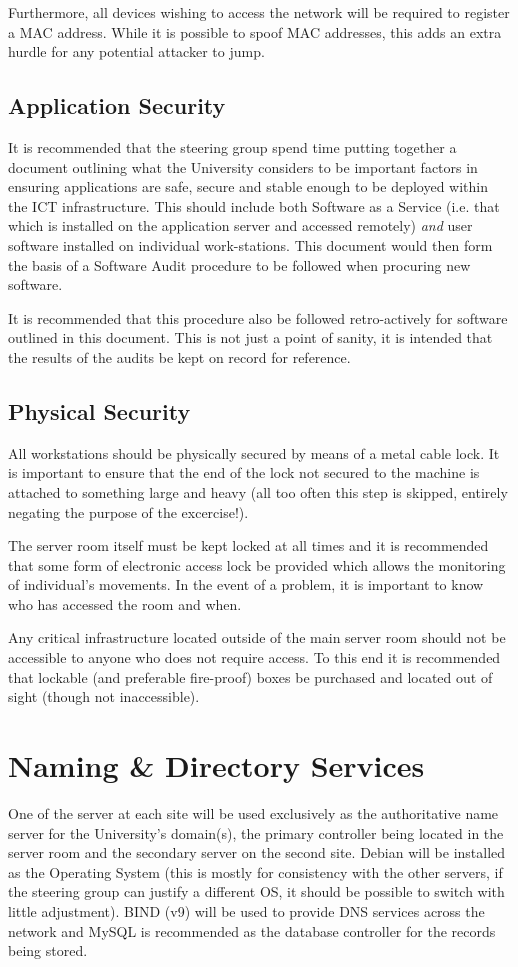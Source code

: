 \documentclass[a4paper, twoside]{article}
\begin{document}
Furthermore, all devices wishing to access the network will be required to
register a MAC address. While it is possible to spoof MAC addresses, this adds
an extra hurdle for any potential attacker to jump.

\subsection{Application Security}
It is recommended that the steering group spend time putting together a document
outlining what the University considers to be important factors in ensuring
applications are safe, secure and stable enough to be deployed within the ICT
infrastructure. This should include both Software as a Service (i.e. that which
is installed on the application server and accessed remotely) \emph{and} user
software installed on individual work-stations. This document would then form
the basis of a Software Audit procedure to be followed when procuring new
software.

It is recommended that this procedure also be followed retro-actively for
software outlined in this document. This is not just a point of sanity, it is
intended that the results of the audits be kept on record for reference.

\subsection{Physical Security}
All workstations should be physically secured by means of a metal cable lock. It
is important to ensure that the end of the lock not secured to the machine is
attached to something large and heavy (all too often this step is skipped,
entirely negating the purpose of the excercise!).

The server room itself must be kept locked at all times and it is recommended
that some form of electronic access lock be provided which allows the monitoring
of individual's movements. In the event of a problem, it is important to know
who has accessed the room and when.

Any critical infrastructure located outside of the main server room should not
be accessible to anyone who does not require access. To this end it is
recommended that lockable (and preferable fire-proof) boxes be purchased and
located out of sight (though not inaccessible).

\section{Naming \& Directory Services}
\label{sec:nandd}
One of the server at each site will be used exclusively as the authoritative name server for
the University's domain(s), the primary controller being located in the server
room and the secondary server on the second site. Debian will be installed as the Operating System
(this is mostly for consistency with the other servers, if the steering group
can justify a different OS, it should be possible to switch with little
adjustment). BIND (v9) will be used to provide DNS services across the network
and MySQL is recommended as the database controller for the records being
stored.
\end{document}
